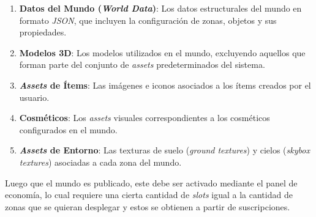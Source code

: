 \begin{enumerate}
  \item \textbf{Datos del Mundo (\textit{World Data})}: Los datos estructurales del mundo en formato \textit{JSON}, que incluyen la configuración
  de zonas, objetos y sus propiedades.
  \item \textbf{Modelos 3D}: Los modelos utilizados en el mundo, excluyendo aquellos que forman parte del
  conjunto de \textit{assets} predeterminados del sistema.
  \item \textbf{\textit{Assets} de Ítems}: Las imágenes e iconos asociados a los ítems creados por el usuario.
  \item \textbf{Cosméticos}: Los \textit{assets} visuales correspondientes a los cosméticos configurados en el mundo.
  \item \textbf{\textit{Assets} de Entorno}: Las texturas de suelo (\textit{ground textures}) y cielos
  (\textit{skybox textures}) asociadas a cada zona del mundo.
\end{enumerate}

Luego que el mundo es publicado, este debe ser activado mediante el panel de economía, lo cual requiere una cierta cantidad de \textit{slots}
igual a la cantidad de zonas que se quieran desplegar y estos se obtienen a partir de suscripciones.
